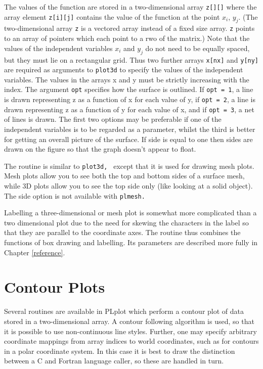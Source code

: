 The values of the function are stored in a two-dimensional array {\tt z[][]}
where the array element {\tt z[i][j]} contains the value of the function at
the point $x_i$, $y_j$.  (The two-dimensional array {\tt z} is a vectored
array instead of a fixed size array.  {\tt z} points to an array of pointers
which each point to a rwo of the matrix.) Note that the values of the
independent variables $x_i$ and $y_j$ do not need to be equally spaced, but
they must lie on a rectangular grid.  Thus two further arrays {\tt x[nx]}
and {\tt y[ny]} are required as arguments to {\tt plot3d} to specify the
values of the independent variables.  The values in the arrays x and y must
be strictly increasing with the index.  The argument {\tt opt} specifies how
the surface is outlined.  If {\tt opt = 1}, a line is drawn representing z as
a function of x for each value of y, if {\tt opt = 2}, a line is drawn
representing z as a function of y for each value of x, and if {\tt opt = 3}, a
net of lines is drawn.  The first two options may be preferable if one of
the independent variables is to be regarded as a parameter, whilst the third
is better for getting an overall picture of the surface.  If side is equal
to one then sides are drawn on the figure so that the graph doesn't appear
to float.

The routine  is similar to {\tt plot3d, } except that it is
used for drawing mesh plots. Mesh plots allow you to see both the top and
bottom sides of a surface mesh, while 3D plots allow you to see the top
side only (like looking at a solid object). The side option is not
available with {\tt plmesh.}

Labelling a three-dimensional or mesh plot is somewhat more complicated than
a two dimensional plot due to the need for skewing the characters in the
label so that they are parallel to the coordinate axes.  The routine
 thus combines the functions of box drawing and labelling.  Its
parameters are described more fully in Chapter \ref{reference}.


\section {Contour Plots}\label{contour}

Several routines are available in PLplot which perform a contour plot of
data stored in a two-dimensional array.  A contour following algorithm is
used, so that it is possible to use non-continuous line styles.  Further, 
one may specify arbitrary coordinate mappings from array indices to world
coordinates, such as for contours in a polar coordinate system.  In this
case it is best to draw the distinction between a C and Fortran language
caller, so these are handled in turn. 

